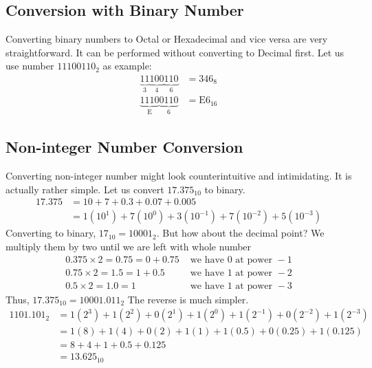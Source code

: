 \subsection{Conversion with Binary Number}
\noindent Converting binary numbers to Octal or Hexadecimal and vice versa are very straightforward. It can be performed without converting to Decimal first. Let us use number $11100110_2$ as example:
\begin{equation} \label{eq7}
\begin{split}
\underbrace{11}_\text{3}\underbrace{100}_\text{4}\underbrace{110}_\text{6} & = 346_8\\
\underbrace{1110}_\text{E}\underbrace{0110}_\text{6} & = \text{E}6_{16}
\end{split}
\end{equation}
\subsection{Non-integer Number Conversion}
Converting non-integer number might look counterintuitive and intimidating. It is actually rather simple. Let us convert $17.375_{10}$ to binary.
\[\begin{split}
17.375 & = 10 + 7 + 0.3+0.07+0.005 \\
& = 1(10^1) + 7(10^0) + 3(10^{-1}) + 7(10^{-2})+5(10^{-3})
\end{split}\]
Converting to binary, $17_{10} = 10001_2$. But how about the decimal point?
We multiply them by two until we are left with whole number
\begin{equation} \label{eq8}
\begin{split}
0.375 \times 2  = 0.75 = 0+0.75 & \text{ we have 0 at power }-1\\
0.75 \times 2  = 1.5 = 1+0.5 & \text{ we have 1 at power }-2\\
0.5 \times 2  = 1.0 = 1 & \text{ we have 1 at power }-3
\end{split}
\end{equation} 
Thus, $17.375_{10} = 10001.011_2$\newline
The reverse is much simpler.
\begin{equation} \label{eq9}
\begin{split}
1101.101_2 & = 1(2^3)+1(2^2)+0(2^1)+1(2^0)+1(2^{-1})+0(2^{-2})+1(2^{-3}) \\
& = 1(8)+1(4)+0(2)+1(1)+1(0.5)+0(0.25)+1(0.125) \\
& = 8 + 4 + 1+ 0.5+0.125 \\
& = 13.625_{10}
\end{split}
\end{equation} 

